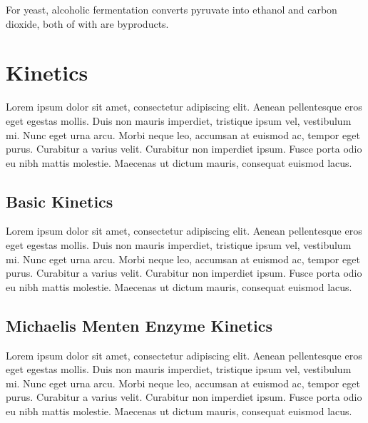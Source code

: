 \documentclass[12pt]{article}
\begin{document}
\medskip

For yeast, alcoholic fermentation converts pyruvate into ethanol and carbon dioxide, both of with are byproducts.

\medskip

\section{Kinetics}
Lorem ipsum dolor sit amet, consectetur adipiscing elit. Aenean pellentesque eros eget egestas mollis. Duis non mauris imperdiet, tristique ipsum vel, vestibulum mi. Nunc eget urna arcu. Morbi neque leo, accumsan at euismod ac, tempor eget purus. Curabitur a varius velit. Curabitur non imperdiet ipsum. Fusce porta odio eu nibh mattis molestie. Maecenas ut dictum mauris, consequat euismod lacus.

\subsection{Basic Kinetics}
Lorem ipsum dolor sit amet, consectetur adipiscing elit. Aenean pellentesque eros eget egestas mollis. Duis non mauris imperdiet, tristique ipsum vel, vestibulum mi. Nunc eget urna arcu. Morbi neque leo, accumsan at euismod ac, tempor eget purus. Curabitur a varius velit. Curabitur non imperdiet ipsum. Fusce porta odio eu nibh mattis molestie. Maecenas ut dictum mauris, consequat euismod lacus.

\subsection{Michaelis Menten Enzyme Kinetics}
Lorem ipsum dolor sit amet, consectetur adipiscing elit. Aenean pellentesque eros eget egestas mollis. Duis non mauris imperdiet, tristique ipsum vel, vestibulum mi. Nunc eget urna arcu. Morbi neque leo, accumsan at euismod ac, tempor eget purus. Curabitur a varius velit. Curabitur non imperdiet ipsum. Fusce porta odio eu nibh mattis molestie. Maecenas ut dictum mauris, consequat euismod lacus.

\nocite{*}

\newpage

\printbibliography
\end{document}
